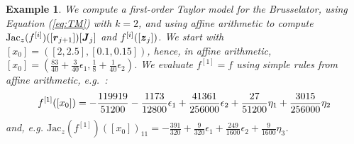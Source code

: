 \documentclass{sig-alternate-05-2015}
\newcommand\ForAuthors[1]%
 {\par\smallskip                     %
  \begin{center}%
   \fbox%
   {\parbox{0.9\linewidth}%
    {\raggedright\sc--- #1}%
   }%
  \end{center}%
  \par\smallskip                     %
 }
\newtheorem{example}{Example}
\def\intvl#1{\mbox{$[ #1 ]$}}
\begin{document}
\begin{example}
\label{running3}
We compute a first-order Taylor model for the Brusselator, using Equation
(\ref{eq:TM}) with $k=2$, and using affine arithmetic to compute 
$\mbox{Jac}_z(f^{[i]})([\r_{j+1}])[\J_j]$ and $f^{[i]}([{\z}_j])$.
We start with 
$\intvl{x_0}=\left([2,2.5],[0.1,0.15]\right)$, hence, in affine arithmetic,
$\intvl{x_0}=\left(\frac{83}{40}+\frac{3}{40}\epsilon_1,
\frac{1}{8}+\frac{1}{40}\epsilon_2\right)$. We evaluate $f^{[1]}=f$ using
simple rules from affine arithmetic, e.g.~: 
\begin{equation}
f^{[1]}(\intvl{x_0}) 
= 
\small 
-\frac{119919}{51200}-\frac{1173}{12800} \epsilon_1+\frac{41361}{256000}\epsilon_2
\label{firstcompf1}
+\frac{27}{51200}\eta_1+\frac{3015}{256000}\eta_2
\end{equation}
\noindent and, e.g. $
\mbox{Jac}_z(f^{[1]})([x_0])_{11} %
= 
-\frac{391}{320}+\frac{9}{320}\epsilon_1+\frac{249}{1600}\epsilon_2+\frac{9}{1600}\eta_3
$. 

\end{example}
\end{document}
